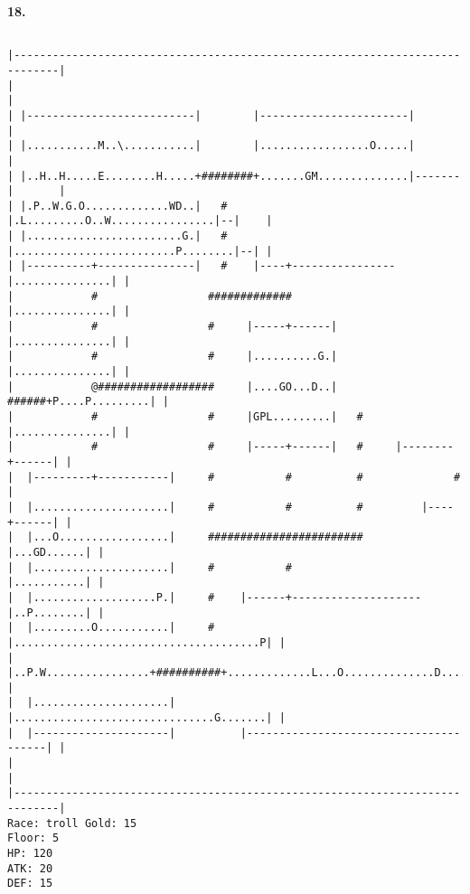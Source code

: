 \documentclass[11pt]{article}
\theoremstyle{plain}
\begin{document}
\newpage
\textbf{18. }
\begin{Verbatim}[fontsize=\scriptsize]

|-----------------------------------------------------------------------------|
|                                                                             |
| |--------------------------|        |-----------------------|               |
| |...........M..\...........|        |.................O.....|               |
| |..H..H.....E........H.....+########+.......GM..............|-------|       |
| |.P..W.G.O.............WD..|   #    |.L.........O..W................|--|    |
| |........................G.|   #    |.........................P........|--| |
| |----------+---------------|   #    |----+----------------|...............| |
|            #                 #############                |...............| |
|            #                 #     |-----+------|         |...............| |
|            #                 #     |..........G.|         |...............| |
|            @##################     |....GO...D..|   ######+P....P.........| |
|            #                 #     |GPL.........|   #     |...............| |
|            #                 #     |-----+------|   #     |--------+------| |
|  |---------+-----------|     #           #          #              #        |
|  |.....................|     #           #          #         |----+------| |
|  |...O.................|     ########################         |...GD......| |
|  |.....................|     #           #                    |...........| |
|  |...................P.|     #    |------+--------------------|..P........| |
|  |.........O...........|     #    |......................................P| |
|  |..P.W................+##########+.............L...O..............D......| |
|  |.....................|          |...............................G.......| |
|  |---------------------|          |---------------------------------------| |
|                                                                             |
|-----------------------------------------------------------------------------|
Race: troll Gold: 15                                                   Floor: 5
HP: 120
ATK: 20
DEF: 15

\end{Verbatim}
\end{document}
